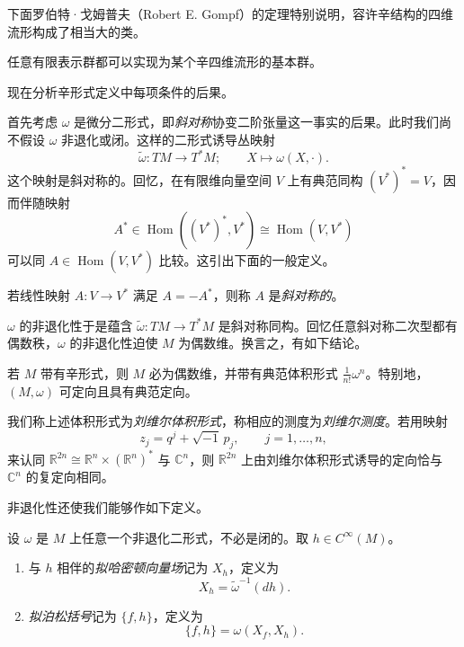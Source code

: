下面罗伯特·戈姆普夫（Robert E. Gompf）的定理特别说明，容许辛结构的四维流形构成了相当大的类。

\begin{theorem}
\label{thm:gompf-fundamental-group}
任意有限表示群都可以实现为某个辛四维流形的基本群。
\end{theorem}

现在分析辛形式定义中每项条件的后果。

首先考虑 $\omega$ 是微分二形式，即\emph{斜对称}协变二阶张量这一事实的后果。此时我们尚不假设 $\omega$ 非退化或闭。这样的二形式诱导丛映射
\[
  \widetilde\omega:TM\longrightarrow T^*M;\qquad
  X\longmapsto\omega(X,\mathord\cdot).
\]
这个映射是斜对称的。回忆，在有限维向量空间 $V$ 上有典范同构 $(V^*)^*=V$，因而伴随映射
\[
  A^*\in\operatorname{Hom}((V^*)^*,V^*)
  \cong\operatorname{Hom}(V,V^*)
\]
可以同 $A\in\operatorname{Hom}(V,V^*)$ 比较。这引出下面的一般定义。

\begin{definition}
\label{def:skew-symmetric-map}
若线性映射 $A:V\to V^*$ 满足 $A=-A^*$，则称 $A$ 是\emph{斜对称的}。
\end{definition}

$\omega$ 的非退化性于是蕴含 $\widetilde\omega:TM\to T^*M$ 是斜对称同构。回忆任意斜对称二次型都有偶数秩，$\omega$ 的非退化性迫使 $M$ 为偶数维。换言之，有如下结论。

\begin{corollary}
\label{cor:symplectic-even-oriented}
若 $M$ 带有辛形式，则 $M$ 必为偶数维，并带有典范体积形式 $\frac1{n!}\omega^n$。特别地，$(M,\omega)$ 可定向且具有典范定向。
\end{corollary}

我们称上述体积形式为\emph{刘维尔体积形式}，称相应的测度为\emph{刘维尔测度}。若用映射
\[
  z_j=q^j+\sqrt{-1}\,p_j,\qquad j=1,\ldots,n,
\]
来认同 $\mathbb R^{2n}\cong\mathbb R^n\times(\mathbb R^n)^*$ 与 $\mathbb C^n$，则 $\mathbb R^{2n}$ 上由刘维尔体积形式诱导的定向恰与 $\mathbb C^n$ 的复定向相同。

非退化性还使我们能够作如下定义。

\begin{definition}
\label{def:quasi-hamiltonian-poisson}
设 $\omega$ 是 $M$ 上任意一个非退化二形式，不必是闭的。取 $h\in C^\infty(M)$。
\begin{enumerate}[label=(\arabic*)]
  \item 与 $h$ 相伴的\emph{拟哈密顿向量场}记为 $X_h$，定义为
  \begin{equation}
    X_h=\widetilde\omega^{-1}(dh).
    \label{eq:2.2.4}
  \end{equation}
  \item \emph{拟泊松括号}记为 $\{f,h\}$，定义为
  \begin{equation}
    \{f,h\}=\omega(X_f,X_h).
    \label{eq:2.2.5}
  \end{equation}
\end{enumerate}
\end{definition}

